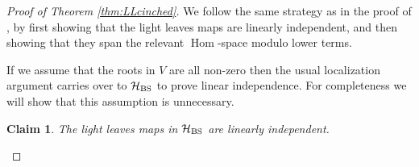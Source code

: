 \documentclass{amsart}
\theoremstyle{plain}
\newtheorem{clm}[thm]{Claim}
\theoremstyle{definition}
\theoremstyle{remark}
\numberwithin{equation}{section}
\DeclareMathOperator{\Hom}{Hom}
\begin{document}
\begin{proof}[Proof of Theorem \ref{thm:LLcinched}]
We follow the same strategy as in the proof of \cite[Proposition~7.6]{EW-SoergelCalc}, by first showing that the light leaves maps are linearly independent, and then showing that they span the relevant $\Hom$-space modulo lower terms. 

If we assume that the roots in $V$ are all non-zero then the usual localization argument carries over to $\mathcal{H}_{\rm BS}$ to prove linear independence. 
For completeness we will show that this assumption is unnecessary.

\begin{clm} \label{clm:LLlinindep}
The light leaves maps in $\mathcal{H}_{\rm BS}$ are linearly independent.
\end{clm}



\end{proof}
\end{document}
